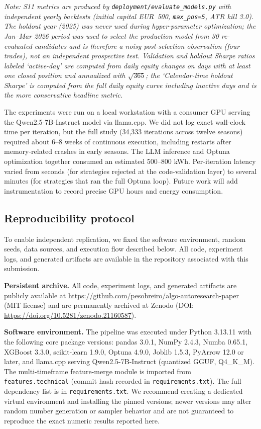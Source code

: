 \documentclass[11pt,a4paper]{article}
\begin{document}
\emph{Note: S11 metrics are produced by \texttt{deployment/evaluate\_models.py} with independent yearly backtests (initial capital EUR~500, \texttt{max\_pos=5}, ATR kill 3.0). The holdout year (2025) was never used during hyper-parameter optimization; the Jan--Mar 2026 period was used to select the production model from 30 re-evaluated candidates and is therefore a noisy post-selection observation (four trades), not an independent prospective test. Validation and holdout Sharpe ratios labeled `active-day' are computed from daily equity changes on days with at least one closed position and annualized with $\sqrt{365}$; the `Calendar-time holdout Sharpe' is computed from the full daily equity curve including inactive days and is the more conservative headline metric.}

The experiments were run on a local workstation with a consumer GPU serving the Qwen2.5-7B-Instruct model via llama.cpp. We did not log exact wall-clock time per iteration, but the full study (34,333 iterations across twelve seasons) required about 6--8 weeks of continuous execution, including restarts after memory-related crashes in early seasons. The LLM inference and Optuna optimization together consumed an estimated 500--800 kWh. Per-iteration latency varied from seconds (for strategies rejected at the code-validation layer) to several minutes (for strategies that ran the full Optuna loop). Future work will add instrumentation to record precise GPU hours and energy consumption.

\subsection{Reproducibility protocol}\label{reproducibility-protocol}

To enable independent replication, we fixed the software environment, random seeds, data sources, and execution flow described below. All code, experiment logs, and generated artifacts are available in the repository associated with this submission.

\textbf{Persistent archive.} All code, experiment logs, and generated artifacts are publicly available at \url{https://github.com/pesobreiro/algo-autoresearch-paper} (MIT license) and are permanently archived at Zenodo (DOI: \url{https://doi.org/10.5281/zenodo.21160587}).

\textbf{Software environment.} The pipeline was executed under Python 3.13.11 with the following core package versions: pandas 3.0.1, NumPy 2.4.3, Numba 0.65.1, XGBoost 3.3.0, scikit-learn 1.9.0, Optuna 4.9.0, Joblib 1.5.3, PyArrow 12.0 or later, and llama.cpp serving Qwen2.5-7B-Instruct (quantized GGUF, Q4\_K\_M). The multi-timeframe feature-merge module is imported from \texttt{features.technical} (commit hash recorded in \texttt{requirements.txt}). The full dependency list is in \texttt{requirements.txt}. We recommend creating a dedicated virtual environment and installing the pinned versions; newer versions may alter random number generation or sampler behavior and are not guaranteed to reproduce the exact numeric results reported here.
\end{document}
